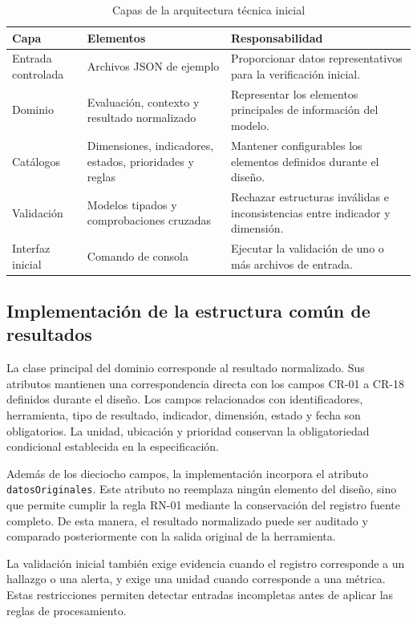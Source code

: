\begin{table}[H]
\centering
\caption{Capas de la arquitectura técnica inicial}
\label{tab:capas-arquitectura-implementacion}
\begin{tabularx}{\textwidth}{p{3.2cm}p{4.3cm}X}
\toprule
\textbf{Capa} & \textbf{Elementos} & \textbf{Responsabilidad}\\
\midrule
Entrada controlada & Archivos JSON de ejemplo & Proporcionar datos representativos para la verificación inicial.\\
Dominio & Evaluación, contexto y resultado normalizado & Representar los elementos principales de información del modelo.\\
Catálogos & Dimensiones, indicadores, estados, prioridades y reglas & Mantener configurables los elementos definidos durante el diseño.\\
Validación & Modelos tipados y comprobaciones cruzadas & Rechazar estructuras inválidas e inconsistencias entre indicador y dimensión.\\
Interfaz inicial & Comando de consola & Ejecutar la validación de uno o más archivos de entrada.\\
\bottomrule
\end{tabularx}
\end{table}

\subsection{Implementación de la estructura común de resultados}

La clase principal del dominio corresponde al resultado normalizado. Sus
atributos mantienen una correspondencia directa con los campos CR-01 a CR-18
definidos durante el diseño. Los campos relacionados con identificadores,
herramienta, tipo de resultado, indicador, dimensión, estado y fecha son
obligatorios. La unidad, ubicación y prioridad conservan la obligatoriedad
condicional establecida en la especificación.

Además de los dieciocho campos, la implementación incorpora el atributo
\texttt{datos\allowbreak Originales}. Este atributo no reemplaza ningún elemento del diseño,
sino que permite cumplir la regla RN-01 mediante la conservación del registro
fuente completo. De esta manera, el resultado normalizado puede ser auditado y
comparado posteriormente con la salida original de la herramienta.

La validación inicial también exige evidencia cuando el registro corresponde a
un hallazgo o una alerta, y exige una unidad cuando corresponde a una métrica.
Estas restricciones permiten detectar entradas incompletas antes de aplicar las
reglas de procesamiento.

